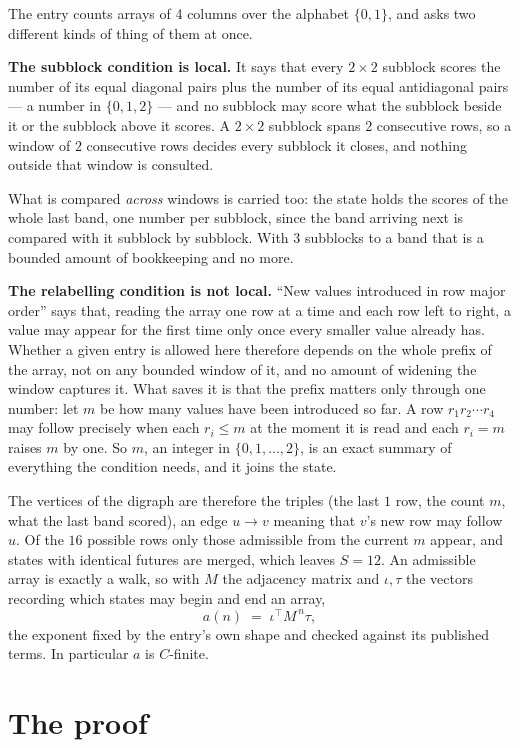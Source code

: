 \documentclass[11pt,a4paper]{article}
\theoremstyle{plain}
\theoremstyle{definition}
\begin{document}
The entry counts arrays of 4 columns over the alphabet $\{0,1\}$, and asks two different kinds of thing of them at once.

\textbf{The subblock condition is local.} It says that every $2\times2$ subblock scores the number of its equal diagonal pairs plus the number of its equal antidiagonal pairs --- a number in $\{0,1,2\}$ --- and no subblock may score what the subblock beside it or the subblock above it scores. A $ 2\times2$ subblock spans $2$ consecutive rows, so a window of $2$ consecutive rows decides every subblock it closes, and nothing outside that window is consulted.

What is compared \emph{across} windows is carried too: the state holds the scores of the whole last band, one number per subblock, since the band arriving next is compared with it subblock by subblock. With $3$ subblocks to a band that is a bounded amount of bookkeeping and no more.

\textbf{The relabelling condition is not local.} ``New values introduced in row major order'' says that, reading the array one row at a time and each row left to right, a value may appear for the first time only once every smaller value already has. Whether a given entry is allowed here therefore depends on the whole prefix of the array, not on any bounded window of it, and no amount of widening the window captures it. What saves it is that the prefix matters only through one number: let $m$ be how many values have been introduced so far. A row $r_1r_2\cdots r_4$ may follow precisely when each $r_i\le m$ at the moment it is read and each $r_i=m$ raises $m$ by one. So $m$, an integer in $\{0,1,\dots,2\}$, is an exact summary of everything the condition needs, and it joins the state.

The vertices of the digraph are therefore the triples (the last $1$ row, the count $m$, what the last band scored), an edge $u\to v$ meaning that $v$'s new row may follow $u$. Of the $16$ possible rows only those admissible from the current $m$ appear, and states with identical futures are merged, which leaves $S=12$. An admissible array is exactly a walk, so with $M$ the adjacency matrix and $\iota,\tau$ the vectors recording which states may begin and end an array,
\[
a(n)\;=\;\iota^{\!\top}M^{\,n}\tau ,
\]
the exponent fixed by the entry's own shape and checked against its published terms. In
particular $a$ is $C$-finite.

\section{The proof}
\end{document}
